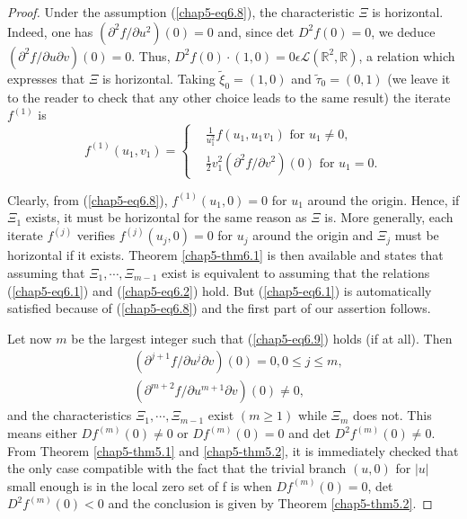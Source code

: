 \begin{proof}
Under the assumption (\ref{chap5-eq6.8}), the characteristic $\Xi$ is
horizontal. Indeed, one has $(\partial^{2}f/ \partial u^{2})(0) = 0$
and, since det $D^{2}f(0) = 0$, we deduce $(\partial^{2}f/\partial u
\partial v) (0) = 0$. Thus, $D^{2}f(0) \cdot (1, 0) = 0 \epsilon
\mathscr{L} (\mathbb{R}^{2}, \mathbb{R})$, a relation which expresses
that $\Xi$ is horizontal. Taking $\widetilde{\xi}_{0} = (1, 0)$ and
$\widetilde{\tau}_{0} = (0, 1)$ (we leave it to the reader to check
that any other choice leads to the same result) the iterate $f^{(1)}$
is
\begin{equation*}
f^{(1)}(u_{1}, v_{1}) = 
\begin{cases}
& \frac{1}{u_{1}^{2}} f(u_{1}, u_{1} v_{1}) \text{ for } u_{1} \neq
  0,\\
& \frac{1}{2} v_{1}^{2} (\partial^{2}f/ \partial v^{2})(0) \text{ for
  } u_{1} = 0.
\end{cases}
\end{equation*}

Clearly, from (\ref{chap5-eq6.8}), $f^{(1)} (u_{1}, 0) = 0$ for
$u_{1}$ around the origin. Hence, if\pageoriginale $\Xi_{1}$ exists,
it must be horizontal for the same reason as $\Xi$ is. More generally,
each iterate $f^{(j)}$ verifies $f^{(j)} (u_{j}, 0) = 0$ for $u_{j}$
around the origin and $\Xi_{j}$ must be horizontal if it
exists. Theorem \ref{chap5-thm6.1} is then available and states that
assuming that $\Xi_{1}, \cdots, \Xi_{m-1}$ exist is equivalent to
assuming that the relations (\ref{chap5-eq6.1}) and
(\ref{chap5-eq6.2}) hold. But (\ref{chap5-eq6.1}) is automatically
satisfied because of (\ref{chap5-eq6.8}) and the first part of our
assertion follows.

Let now $m$ be the largest integer such that (\ref{chap5-eq6.9}) holds
(if at all). Then
\begin{align*}
& (\partial^{j+1}f/ \partial u^{j} \partial v) (0) = 0, 0 \leq j \leq
  m,\\
& (\partial^{m+2} f / \partial u^{m+1} \partial v)(0) \neq 0,
\end{align*}
and the characteristics $\Xi_{1}, \cdots, \Xi_{m-1}$ exist $(m \geq
1)$ while $\Xi_{m}$ does not. This means either $Df^{(m)} (0) \neq 0$
or $Df^{(m)} (0) = 0$ and det $D^{2}f^{(m)}(0) \neq 0$. From Theorem
\ref{chap5-thm5.1} and \ref{chap5-thm5.2}, it is immediately checked
that the only case compatible with the fact that the trivial branch
$(u, 0)$ for $|u|$ small enough is in the local zero set of f is when
$Df^{(m)}(0) = 0$, det $D^{2}f^{(m)} (0) < 0$ and the conclusion is
given by Theorem \ref{chap5-thm5.2}. 
\end{proof}

